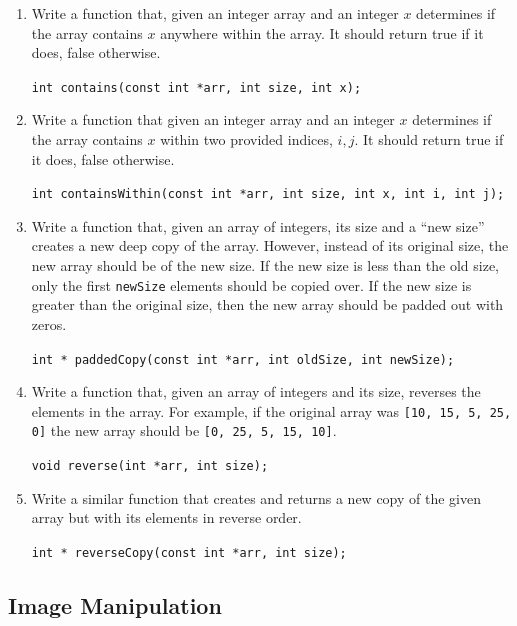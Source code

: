 \documentclass[12pt]{scrartcl}
\begin{document}
\begin{enumerate}

  \item Write a function that, given an integer array and an integer 
  $x$ determines if the array contains $x$ anywhere within the array.
  It should return true if it does, false otherwise.
  
  \texttt{int contains(const int *arr, int size, int x);}

  \item Write a function that given an integer array and an integer 
  $x$ determines if the array contains $x$ within two provided indices,
  $i, j$.  It should return true if it does, false otherwise.

  
  \texttt{int containsWithin(const int *arr, int size, int x, int i, int j);}
  
  \item Write a function that, given an array of integers, its size and a
  ``new size'' creates a new deep copy of the array.  However, instead of
  its original size, the new array should be of the new size.  If the new
  size is less than the old size, only the first \texttt{newSize} 
  elements should be copied over.  If the new size is greater than the original
  size, then the new array should be padded out with zeros.
  
  \texttt{int * paddedCopy(const int *arr, int oldSize, int newSize);}

  \item Write a function that, given an array of integers and its size, 
  reverses the elements in the array.  For example, if the original array
  was \texttt{[10, 15, 5, 25, 0]} the new array should be 
  \texttt{[0, 25, 5, 15, 10]}.
  
  \texttt{void reverse(int *arr, int size);}

  \item Write a similar function that creates and returns a new copy of 
  the given array but with its elements in reverse order. 
  
  \texttt{int * reverseCopy(const int *arr, int size);}

\end{enumerate}

\subsection*{Image Manipulation}
\end{document}
